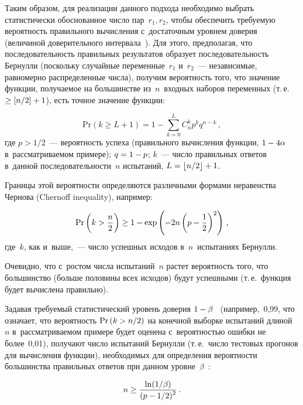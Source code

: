 \begin{multicols}{2}
    Таким образом, для реализации данного подхода необходимо выбрать 
статистически обоснованное число пар~$r_1, r_2$, чтобы обеспечить 
требуемую вероятность правильного вычисления с~достаточным уровнем 
доверия (величиной доверительного интервала~\cite{13-bf}).
    Для этого, предполагая, что последовательность правильных 
результатов образует последовательность Бернулли (поскольку случайные 
переменные~$r_1$ и~$r_2$~--- независимые, равномерно распределенные числа), 
получим вероятность того, что значение функции, получаемое на 
большинстве из~$n$~входных наборов переменных (т.\,е.\ $\geq [n/2]\hm+1$), 
есть точное значение функции:

\noindent
    \begin{equation}
    \mathrm{Pr} \left( k\geq L+1\right)=1-\sum\limits^L_{k=0} C_n^k p^k 
q^{n-k}\,,
    \label{e3-bf}
    \end{equation}
где $p>1/2$~--- вероятность успеха (правильного вычисления функции, 
$1\hm- 4\alpha$ в~рассматриваемом примере); $q\hm = 1 \hm- p$; $k$~--- 
число правильных ответов в~данной последовательности~$n$ испытаний, 
$L\hm= \lfloor n/2\rfloor\hm+1$.

    Границы этой вероятности определяются различными формами 
неравенства Чернова (Chernoff inequality), например:

\noindent
    \begin{equation}
    \mathrm{Pr}\left( k>\displaystyle\frac{\displaystyle n\mathstrut}{\displaystyle 2\mathstrut}\right) \geq 1-\exp \left( -2n\left( p-
\displaystyle\frac{\displaystyle 1\mathstrut}{\displaystyle 2\mathstrut}\right)^2\right)\,,
    \label{e4-bf}
    \end{equation}
где~$k$, как и~выше,~--- число успешных исходов в~$n$~испытаниях Бернулли.

    Очевидно, что с~ростом числа испытаний~$n$ растет вероятность того, 
что большинство (больше половины всех исходов) будут успешными (т.\,е.\ 
функция будет вычислена правильно).
    
    Задавая требуемый статистический уровень доверия $1\hm-
\beta$~\cite{13-bf} (например,~0,99, что означает, что вероятность $\mathrm{Pr}\,(k\hm> 
n/2)$ на конечной выборке испытаний длиной~$n$ в~рассматриваемом 
примере будет оценена с~вероятностью ошибки не более~0,01), получают 
число испытаний Бернулли (т.\,е.\ число тестовых прогонов для вычисления 
функции), необходимых для определения вероятности большинства 
правильных ответов при данном уровне~$\beta$~\cite{12-bf, 19-bf}:

\noindent
    \begin{equation}
    n\geq  \displaystyle\frac{\displaystyle \ln(1/\beta)\mathstrut}{\displaystyle (p-1/2)^2\mathstrut}\,.
    \label{e5-bf}
    \end{equation}
    

\end{multicols}
